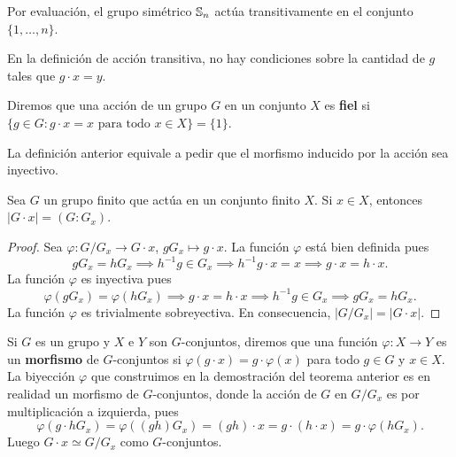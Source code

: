\begin{example}
Por evaluación, 
el grupo simétrico $\mathbb{S}_n$ actúa transitivamente en el conjunto $\{1,\dots,n\}$.  	
\end{example}

En la definición de acción transitiva, no hay condiciones sobre la cantidad de $g$ tales que $g\cdot x=y$. 

\begin{definition}
Diremos que una acción de un grupo $G$ en un conjunto $X$ es \textbf{fiel} si 
$\{g\in G:g\cdot x=x\text{ para todo $x\in X$}\}=\{1\}$. 
\end{definition}

La definición anterior equivale a pedir que el morfismo inducido por la acción sea inyectivo. 


\begin{theorem}
Sea $G$ un grupo finito que actúa en un conjunto finito $X$. Si $x\in X$, entonces $|G\cdot x|=(G:G_x)$. 
\end{theorem}

\begin{proof}
	Sea $\varphi\colon G/G_x\to G\cdot x$, $gG_x\mapsto g\cdot x$. La función $\varphi$ está bien definida pues
	\[
	gG_x=hG_x\implies h^{-1}g\in G_x
	\implies h^{-1}g\cdot x=x\implies g\cdot x=h\cdot x.
	\]
	La función $\varphi$ es inyectiva pues 
	\[
	\varphi(gG_x)=\varphi(hG_x)\implies
	g\cdot x=h\cdot x\implies
	h^{-1}g\in G_x\implies gG_x=hG_x.
	\]
	La función $\varphi$ es trivialmente sobreyectiva. En consecuencia, $|G/G_x|=|G\cdot x|$. 
\end{proof}

Si $G$ es un grupo y $X$ e $Y$ son $G$-conjuntos, diremos que una función $\varphi\colon X\to Y$ es 
un \textbf{morfismo} de $G$-conjuntos
si $\varphi(g\cdot x)=g\cdot \varphi(x)$ para todo $g\in G$ y $x\in X$. La 
biyección $\varphi$ que construimos en la demostración del teorema anterior 
es en realidad un morfismo de $G$-conjuntos, 
donde la acción de $G$ en $G/G_x$ es por multiplicación a izquierda, 
pues 
\[
\varphi(g\cdot hG_x)=\varphi((gh)G_x)=(gh)\cdot x=g\cdot (h\cdot x)=g\cdot\varphi(hG_x).
\]
Luego $G\cdot x\simeq G/G_x$ como $G$-conjuntos.

